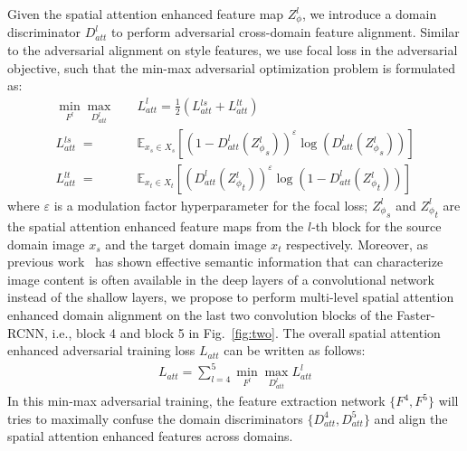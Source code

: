 \documentclass[runningheads]{llncs}
\begin{document}
Given the spatial attention enhanced feature map $Z^l_\phi$, we introduce a domain discriminator 
$D_{att}^l$ to perform adversarial cross-domain feature alignment. 
Similar to the adversarial alignment on style features, we use focal loss in the adversarial objective, 
such that the min-max adversarial optimization problem is formulated as:
\begin{align}
\label{eq6}
	\mathop {\min }\limits_{{F^l}} \mathop {\max }\limits_{D_{att}^l} & 
	\quad L_{att}^l =  \frac{1}{2}(L{_{att}^{ls}} + L{_{att}^{lt}})
\\	
	L{_{att}^{ls}} \;= & \quad \mathbb{E}_{x_s\in X_s} \left[ {{{(1 - D_{att}^l(Z{{_\phi ^l}_s}))}^\varepsilon }\log (D_{att}^l(Z{{_\phi ^l}_s}))}\right]
\\
	L{_{att}^{lt}} \;= & \quad \mathbb{E}_{x_t\in X_t} \left[{{{(D_{att}^l(Z{{_\phi ^l}_t}))}^\varepsilon }\log (1 - D_{att}^l(Z{{_\phi ^l}_t}))}\right]
\end{align}
where $\varepsilon$ is a modulation factor hyperparameter for the focal loss; ${Z_\phi ^l}_s$ and ${Z_\phi ^l}_t$ are the spatial attention enhanced feature maps from the $l$-th block 
for the source domain image $x_s$ and the target domain image $x_t$ respectively. 
Moreover, 
as previous work~\cite{Gatys2016Image,JohnsonPerceptual} has shown 
effective semantic information that can characterize image content is often available 
in the deep layers of a convolutional network instead of the shallow layers,
we propose to perform multi-level spatial attention enhanced domain alignment
on the last two convolution blocks of the Faster-RCNN, i.e., block 4 and block 5 in Fig.~\ref{fig:two}.  
The overall spatial attention enhanced adversarial training loss $L_{att}$ can be written as follows:
\begin{align}
\label{eq10}
{L_{att}} = \sum\nolimits_{l = 4}^5 {\mathop {\min }\limits_{{F^l}} \mathop {\max }\limits_{D_{att}^l} L_{att}^l}
\end{align}
In this min-max adversarial training, 
the feature extraction network $\{F^4, F^5\}$ will tries to maximally confuse the 
domain discriminators 
$\{D_{att}^4, D_{att}^5\}$ and align the spatial attention enhanced features across domains. 
\end{document}
